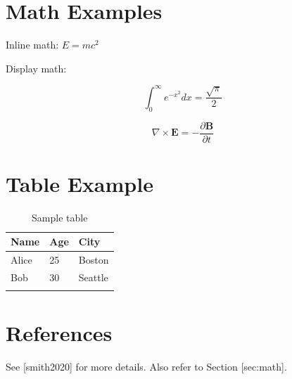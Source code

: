 \documentclass[11pt,a4paper]{article}
\begin{document}
\section{Math Examples}

Inline math: $E = mc^2$

Display math:

$$\int_0^\infty e^{-x^2} dx = \frac{\sqrt{\pi}}{2}$$

$$\begin{equation}
\nabla \times \mathbf{E} = -\frac{\partial \mathbf{B}}{\partial t}
\end{equation}$$

\section{Table Example}

\begin{table}[h]
\caption{Sample table}
\begin{tabular}{|l|l|l|}
\hline
Name & Age & City \\ \hline
Alice & 25 & Boston \\ \hline
Bob & 30 & Seattle \\ \hline
 &  &  \\ \hline
\end{tabular}
\end{table}

\section{References}

See [smith2020] for more details. Also refer to Section [sec:math].
\end{document}
